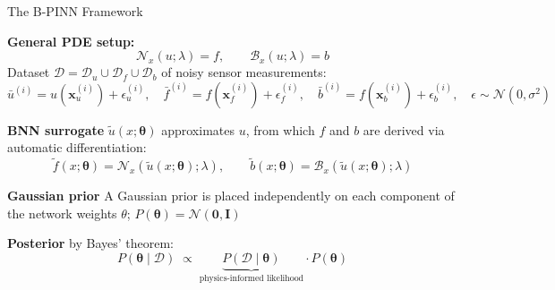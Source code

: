 \documentclass[10pt, aspectratio=169]{beamer}
\begin{document}
\begin{frame}{The B-PINN Framework}

    \textbf{General PDE setup:}
    \[
        \mathcal{N}_x(u;\lambda) = f, \qquad
        \mathcal{B}_x(u;\lambda) = b
    \]
    Dataset $\mathcal{D} = \mathcal{D}_u \cup \mathcal{D}_f \cup \mathcal{D}_b$ 
    of noisy sensor measurements:
    \[
        \bar{u}^{(i)} = u(\boldsymbol{x}_u^{(i)}) + \epsilon_u^{(i)}, \quad
        \bar{f}^{(i)} = f(\boldsymbol{x}_f^{(i)}) + \epsilon_f^{(i)}, \quad
        \bar{b}^{(i)} = f(\boldsymbol{x}_b^{(i)}) + \epsilon_b^{(i)}, \quad
        \epsilon \sim \mathcal{N}(0, \sigma^2)
    \]

    \vspace{0.3cm}
    \textbf{BNN surrogate} $\tilde{u}(x;\boldsymbol{\theta})$ approximates $u$, 
    from which $f$ and $b$ are derived via automatic differentiation:
    \[
        \tilde{f}(x;\boldsymbol{\theta}) = \mathcal{N}_x(\tilde{u}(x;\boldsymbol{\theta});\lambda),
        \qquad
        \tilde{b}(x;\boldsymbol{\theta}) = \mathcal{B}_x(\tilde{u}(x;\boldsymbol{\theta});\lambda)
    \]

    \vspace{0.3cm}
    \textbf{Gaussian prior} A Gaussian prior is placed independently on each component of the network weights $\theta$;  
    $P(\boldsymbol{\theta}) = \mathcal{N}(\boldsymbol{0}, \boldsymbol{I})$

    \vspace{0.2cm}
    \textbf{Posterior} by Bayes' theorem:
    \[
        P(\boldsymbol{\theta} \mid \mathcal{D}) \;\propto\; 
        \underbrace{P(\mathcal{D} \mid \boldsymbol{\theta})}_{\text{physics-informed likelihood}} 
        \cdot 
        P(\boldsymbol{\theta})
    \]

\end{frame}
\end{document}
